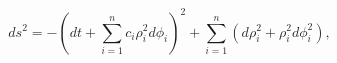 \begin{equation}
\label{metgodeln}
ds^2 = - \left( dt + \sum_{i=1}^{n} c_i \rho_i^2 d\phi_i \right)^2
+ \sum_{i=1}^n \left( d\rho_i^2 + \rho_i^2 d\phi_i^2 \right),
\end{equation}

